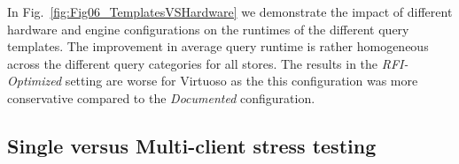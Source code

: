 \documentclass[twocolumn]{bmcart}%
\newcommand\todo[1]{\textcolor{red}{#1}}
\begin{document}

In Fig.~\ref{fig:Fig06_TemplatesVSHardware} we demonstrate the impact of different hardware and engine configurations on the runtimes of the different query templates. The improvement in average query runtime is rather homogeneous across the different query categories for all stores. The results in the \emph{RFI-Optimized} setting are worse for Virtuoso as the this configuration was more conservative compared to the \emph{Documented} configuration.


\subsection{Single versus Multi-client stress testing}
\label{subsec:load}
%
\end{document}
